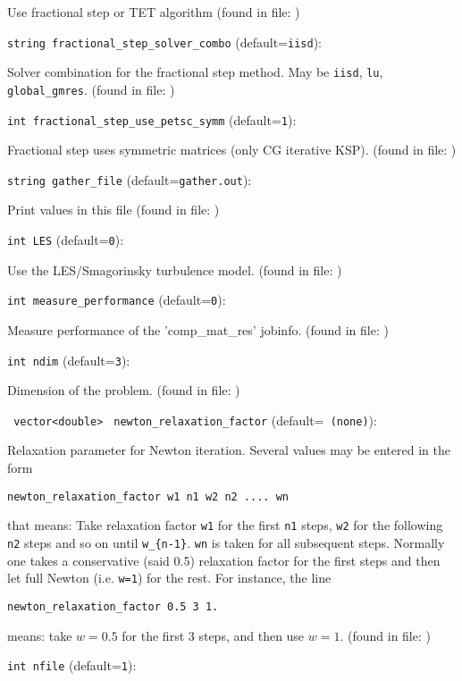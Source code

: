 Use fractional step or TET algorithm
 (found in file: \verb++)
\item\verb+string fractional_step_solver_combo+ {\rm(default=\verb|iisd|)}:

Solver combination for the fractional step method. May be \verb+iisd+, 
 \verb+lu+, \verb+global_gmres+. 
 (found in file: \verb++)
\item\verb+int fractional_step_use_petsc_symm+ {\rm(default=\verb|1|)}:

Fractional step uses symmetric matrices (only CG iterative KSP).
 (found in file: \verb++)
\item\verb+string gather_file+ {\rm(default=\verb|gather.out|)}:

Print values in this file 
 (found in file: \verb++)
\item\verb+int LES+ {\rm(default=\verb|0|)}:

Use the LES/Smagorinsky turbulence model. 
 (found in file: \verb++)
\item\verb+int measure_performance+ {\rm(default=\verb|0|)}:

Measure performance of the 'comp\_mat\_res' jobinfo. 
 (found in file: \verb++)
\item\verb+int ndim+ {\rm(default=\verb|3|)}:

Dimension of the problem.
 (found in file: \verb++)
\item\verb+ vector<double>+ \verb+ newton_relaxation_factor+ {\rm(default=\verb| (none)|)}:

Relaxation parameter for Newton iteration. Several
values may be entered in the form
%
\begin{verbatim} 
newton_relaxation_factor w1 n1 w2 n2 .... wn
\end{verbatim}
%
that means: Take relaxation factor \verb+w1+
for the first \verb+n1+ steps, \verb+w2+ for the following \verb+n2+ steps
and so on until \verb+w_{n-1}+. \verb+wn+ is taken for all subsequent 
steps. Normally one takes a conservative (said 0.5) relaxation
factor for the first steps and then let full Newton (i.e. \verb+w=1+)
for the rest. For instance, the line  
%
\begin{verbatim} 
newton_relaxation_factor 0.5 3 1.
\end{verbatim}
%
means: take $w=0.5$ for the first 3 steps, and then use $w=1$. 
 (found in file: \verb++)
\item\verb+int nfile+ {\rm(default=\verb|1|)}:

